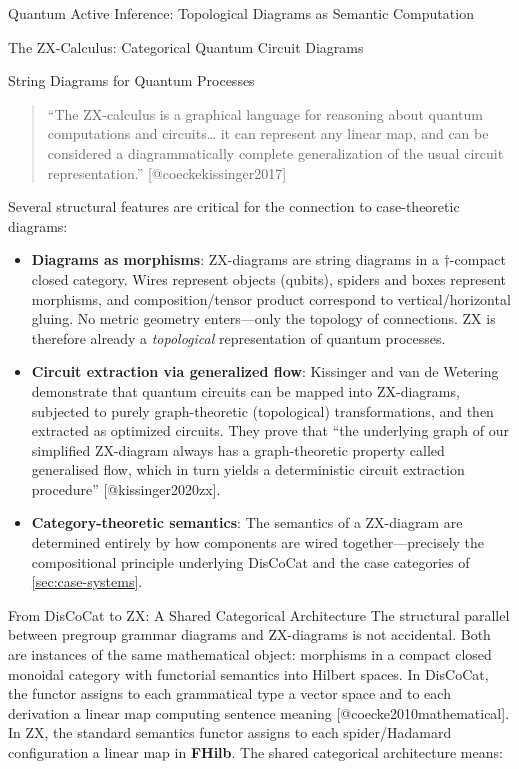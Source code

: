 \documentclass[
  ignorenonframetext,
]{beamer}
\providecommand{\tightlist}{%
  \setlength{\itemsep}{0pt}\setlength{\parskip}{0pt}}
\begin{document}
\begin{frame}{Quantum Active Inference: Topological Diagrams as Semantic
Computation}
\begin{block}{The ZX-Calculus: Categorical Quantum Circuit Diagrams}
\begin{block}{String Diagrams for Quantum Processes}
\begin{quote}
``The ZX-calculus is a graphical language for reasoning about quantum
computations and circuits\ldots{} it can represent any linear map, and
can be considered a diagrammatically complete generalization of the
usual circuit representation.'' {[}@coeckekissinger2017{]}
\end{quote}

Several structural features are critical for the connection to
case-theoretic diagrams:

\begin{itemize}
\tightlist
\item
  \textbf{Diagrams as morphisms}: ZX-diagrams are string diagrams in a
  \(\dagger\)-compact closed category. Wires represent objects (qubits),
  spiders and boxes represent morphisms, and composition/tensor product
  correspond to vertical/horizontal gluing. No metric geometry
  enters---only the topology of connections. ZX is therefore already a
  \emph{topological} representation of quantum processes.
\item
  \textbf{Circuit extraction via generalized flow}: Kissinger and van de
  Wetering demonstrate that quantum circuits can be mapped into
  ZX-diagrams, subjected to purely graph-theoretic (topological)
  transformations, and then extracted as optimized circuits. They prove
  that ``the underlying graph of our simplified ZX-diagram always has a
  graph-theoretic property called generalised flow, which in turn yields
  a deterministic circuit extraction procedure'' {[}@kissinger2020zx{]}.
\item
  \textbf{Category-theoretic semantics}: The semantics of a ZX-diagram
  are determined entirely by how components are wired
  together---precisely the compositional principle underlying DisCoCat
  and the case categories of \autoref{sec:case-systems}.
\end{itemize}
\end{block}

\begin{block}{From DisCoCat to ZX: A Shared Categorical Architecture}
\protect{}\label{from-discocat-to-zx-a-shared-categorical-architecture}
The structural parallel between pregroup grammar diagrams and
ZX-diagrams is not accidental. Both are instances of the same
mathematical object: morphisms in a compact closed monoidal category
with functorial semantics into Hilbert spaces. In DisCoCat, the functor
assigns to each grammatical type a vector space and to each derivation a
linear map computing sentence meaning {[}@coecke2010mathematical{]}. In
ZX, the standard semantics functor assigns to each spider/Hadamard
configuration a linear map in \textbf{FHilb}. The shared categorical
architecture means:


\end{block}
\end{block}
\end{frame}
\end{document}
